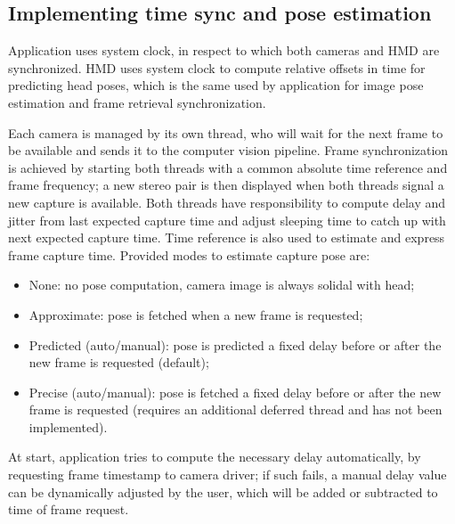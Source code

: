 \subsection{Implementing time sync and pose estimation}

Application uses system clock, in respect to which both cameras and HMD are synchronized. HMD uses system clock to compute relative offsets in time for predicting head poses, which is the same used by application for image pose estimation and frame retrieval synchronization.

Each camera is managed by its own thread, who will wait for the next frame to be available and sends it to the computer vision pipeline. Frame synchronization is achieved by starting both threads with a common absolute time reference and frame frequency; a new stereo pair is then displayed when both threads signal a new capture is available. Both threads have responsibility to compute delay and jitter from last expected capture time and adjust sleeping time to catch up with next expected capture time.
Time reference is also used to estimate and express frame capture time. Provided modes to estimate capture pose are:
\begin{itemize}
\item None: no pose computation, camera image is always solidal with head;
\item Approximate: pose is fetched when a new frame is requested;
\item Predicted (auto/manual): pose is predicted a fixed delay before or after the new frame is requested (default);
\item Precise (auto/manual): pose is fetched a fixed delay before or after the new frame is requested (requires an additional deferred thread and has not been implemented).
\end{itemize}

At start, application tries to compute the necessary delay automatically, by requesting frame timestamp to camera driver; if such fails, a manual delay value can be dynamically adjusted by the user, which will be added or subtracted to time of frame request.
